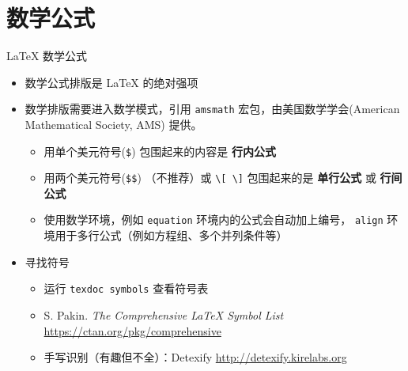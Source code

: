 \section{数学公式}

\begin{frame}[fragile]{\LaTeX{} 数学公式}
    \begin{itemize}
    \item 数学公式排版是 \LaTeX{} 的绝对强项
    \item 数学排版需要进入数学模式，引用 \texttt{amsmath} 宏包，由美国数学学会(American Mathematical Society, AMS) 提供。
        \begin{itemize}
        \item 用单个美元符号(\verb|$|) 包围起来的内容是 {\bf 行内公式}
      \item 用两个美元符号(\verb|$$|) （不推荐）或 \verb|\[ \]| 包围起来的是 {\bf 单行公式} 或 {\bf 行间公式}
        \item 使用数学环境，例如 \texttt{equation} 环境内的公式会自动加上编号，
            \texttt{align} 环境用于多行公式（例如方程组、多个并列条件等）
      \end{itemize}
    \item 寻找符号
        \begin{itemize}
          \item 运行 \texttt{texdoc symbols} 查看符号表
          \item S. Pakin. \emph{The Comprehensive \LaTeX{} Symbol List}
                \url{https://ctan.org/pkg/comprehensive}
          \item 手写识别（有趣但不全）：Detexify \url{http://detexify.kirelabs.org}
        \end{itemize}
    \end{itemize}
\end{frame}

